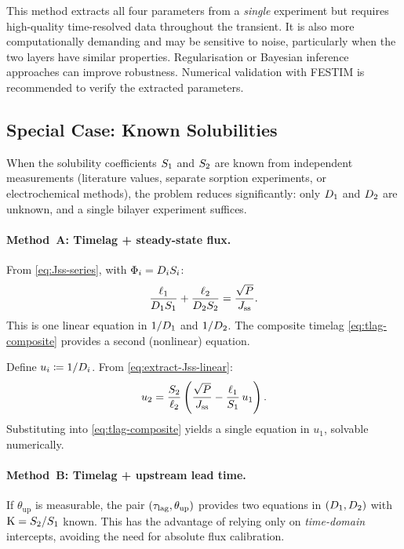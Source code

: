 \begin{remark}
This method extracts all four parameters from a \emph{single} experiment but
requires high-quality time-resolved data throughout the transient.  It is also
more computationally demanding and may be sensitive to noise, particularly when
the two layers have similar properties.  Regularisation or Bayesian inference
approaches can improve robustness.  Numerical validation with FESTIM is
recommended to verify the extracted parameters.
\end{remark}

\subsection{Special Case: Known Solubilities}
\label{sec:known-solubilities}

When the solubility coefficients $S_{1}$ and $S_{2}$ are known from
independent measurements (literature values, separate sorption experiments, or
electrochemical methods), the problem reduces significantly: only $D_{1}$ and
$D_{2}$ are unknown, and a single bilayer experiment suffices.

\paragraph{Method~A: Timelag + steady-state flux.}
From \cref{eq:Jss-series}, with $\Phi_i = D_{i}S_{i}$:
\begin{equation}
  \label{eq:extract-Jss-linear}
  \frac{\ell_{1}}{D_{1}S_{1}} + \frac{\ell_{2}}{D_{2}S_{2}}
  = \frac{\sqrt{P}}{J_{\mathrm{ss}}}.
\end{equation}
This is one linear equation in $1/D_{1}$ and $1/D_{2}$.  The composite
timelag \cref{eq:tlag-composite} provides a second (nonlinear) equation.

Define $u_i \coloneqq 1/D_{i}$.  From \cref{eq:extract-Jss-linear}:
\begin{equation}
  \label{eq:u2-from-u1}
  u_2 = \frac{S_{2}}{\ell_{2}}
  \left(\frac{\sqrt{P}}{J_{\mathrm{ss}}} - \frac{\ell_{1}}{S_{1}}\,u_1\right).
\end{equation}
Substituting into \cref{eq:tlag-composite} yields a single equation in $u_1$,
solvable numerically.

\paragraph{Method~B: Timelag + upstream lead time.}
If $\theta_{\mathrm{up}}$ is measurable, the pair $(\tau_{\mathrm{lag}},
\theta_{\mathrm{up}})$ provides two equations in $(D_{1}, D_{2})$ with
$\mathrm{K} = S_{2}/S_{1}$ known.  This has the advantage of relying only on
\emph{time-domain} intercepts, avoiding the need for absolute flux calibration.

